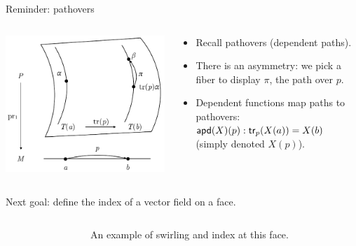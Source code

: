 \begin{frame}{Reminder: pathovers}
\begin{columns}
\begin{column}{0.35\textwidth}
\includegraphics[width=30ex]{figs/pathovers.pdf}
\end{column}
\begin{column}{0.65\textwidth}
\begin{itemize}
\item Recall pathovers (dependent paths).
\item There is an asymmetry: we pick a fiber to display \( \pi \), the path over \( p \).
\item Dependent functions map paths to pathovers: \( \mathsf{apd} (X)(p):\mathsf{tr}_p(X(a))=X(b) \) (simply denoted \( X(p) \)).
\end{itemize}
\end{column}
\end{columns}
\end{frame}

\begin{frame}
Next goal: define the index of a vector field on a face.
\end{frame}

\begin{frame}
\begin{columns}
\begin{column}{0.65\textwidth}
\vspace{12pt}
\begingroup
{}

\endgroup
\end{column}
\begin{column}{0.35\textwidth}
An example of \alert{swirling} and \alert{index} at this face.
\end{column}
\end{columns}
\end{frame}

